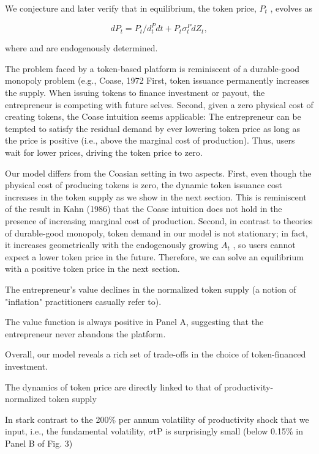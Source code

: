 {We conjecture and later verify that in equilibrium, the token price, $P_t$ , evolves as 

\begin{equation} 
    
    d P_{t}=P_{t}/d_{t}^{P}d t+P_{t}\sigma_{t}^{P}d Z_{t}, 

\end{equation} 

where and are endogenously determined. 

The problem faced by a token-based platform is reminiscent of a durable-good monopoly problem (e.g., Coase, 1972 First, token issuance permanently increases the supply. When issuing tokens to finance investment or payout, the entrepreneur is competing with future selves. Second, given a zero physical cost of creating tokens, the Coase intuition seems applicable: The entrepreneur can be tempted to satisfy the residual demand by ever lowering token price as long as the price is positive (i.e., above the marginal cost of production). Thus, users wait for lower prices, driving the token price to zero.

Our model differs from the Coasian setting in two aspects. First, even though the physical cost of producing tokens is zero, the dynamic token issuance cost increases in the token supply as we show in the next section. This is reminiscent of the result in Kahn (1986) that the Coase intuition does not hold in the presence of increasing marginal cost of production. Second, in contrast to theories of durable-good monopoly, token demand in our model is not stationary; in fact, it increases geometrically with the endogenously growing $A_t$ , so users cannot expect a lower token price in the future. Therefore, we can solve an equilibrium with a positive token price in the next section.

The entrepreneur's value declines in the normalized token supply (a notion of "inflation" practitioners casually refer to).

The value function is always positive in Panel A, suggesting that the entrepreneur never abandons the platform.

Overall, our model reveals a rich set of trade-offs in the choice of token-financed investment.

The dynamics of token price are directly linked to that of productivity-normalized token supply

In stark contrast to the 200\% per annum volatility of productivity shock that we input, i.e., the fundamental volatility, $\sigma$tP is surprisingly small (below 0.15\% in Panel B of Fig. 3)

}
